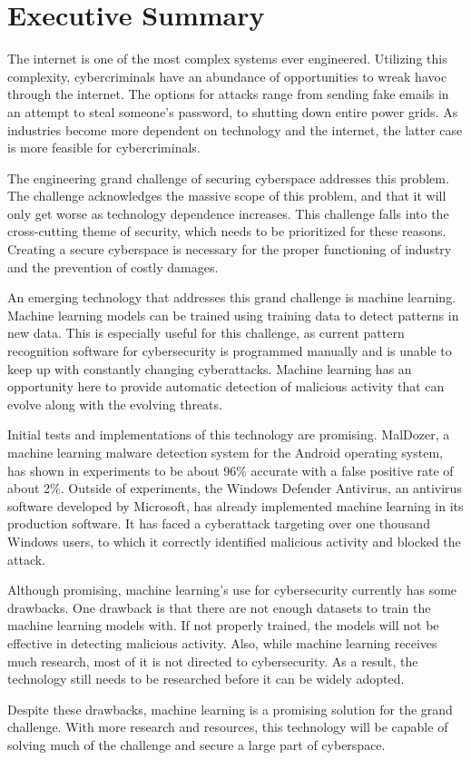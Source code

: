 
\section*{Executive Summary}
\setcounter{page}{2}
The internet is one of the most complex systems ever engineered.
Utilizing this complexity, cybercriminals have an abundance of opportunities to wreak havoc through the internet.
The options for attacks range from sending fake emails in an attempt to steal someone's password, to shutting down entire power grids.
As industries become more dependent on technology and the internet, the latter case is more feasible for cybercriminals.

The engineering grand challenge of securing cyberspace addresses this problem.
The challenge acknowledges the massive scope of this problem, and that it will only get worse as technology dependence increases.
This challenge falls into the cross-cutting theme of security, which needs to be prioritized for these reasons.
Creating a secure cyberspace is necessary for the proper functioning of industry and the prevention of costly damages.

An emerging technology that addresses this grand challenge is machine learning.
Machine learning models can be trained using training data to detect patterns in new data.
This is especially useful for this challenge, as current pattern recognition software for cybersecurity is programmed manually and is unable to keep up with constantly changing cyberattacks.
Machine learning has an opportunity here to provide automatic detection of malicious activity that can evolve along with the evolving threats.

Initial tests and implementations of this technology are promising.
MalDozer, a machine learning malware detection system for the Android operating system, has shown in experiments to be about 96\% accurate with a false positive rate of about 2\%.
Outside of experiments, the Windows Defender Antivirus, an antivirus software developed by Microsoft, has already implemented machine learning in its production software.
It has faced a cyberattack targeting over one thousand Windows users, to which it correctly identified malicious activity and blocked the attack.

Although promising, machine learning's use for cybersecurity currently has some drawbacks.
One drawback is that there are not enough datasets to train the machine learning models with.
If not properly trained, the models will not be effective in detecting malicious activity.
Also, while machine learning receives much research, most of it is not directed to cybersecurity.
As a result, the technology still needs to be researched before it can be widely adopted.

Despite these drawbacks, machine learning is a promising solution for the grand challenge.
With more research and resources, this technology will be capable of solving much of the challenge and secure a large part of cyberspace.

